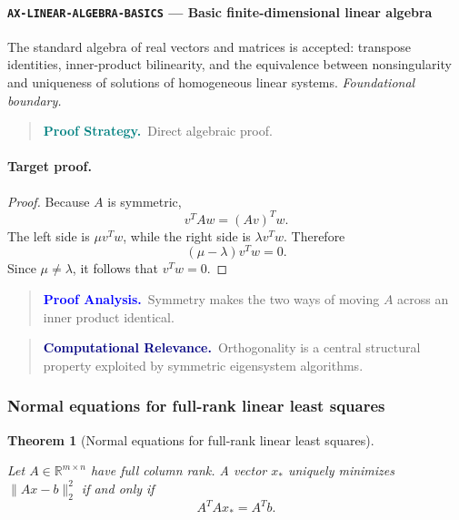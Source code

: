 \documentclass[10pt]{article}
\newcommand{\pidraw}[1]{\begingroup\urlstyle{tt}\nolinkurl{#1}\endgroup}
\newtheorem{theorem}{Theorem}[section]
\theoremstyle{definition}
\theoremstyle{remark}
\newenvironment{proofstrategy}
{\begin{quote}\small\noindent\textbf{\textcolor{teal}{Proof Strategy.}}\ }
{\end{quote}}
\newenvironment{proofanalysis}
{\begin{quote}\small\noindent\textbf{\textcolor{blue}{Proof Analysis.}}\ }
{\end{quote}}
\newenvironment{computationalrelevance}
{\begin{quote}\small\noindent\textbf{\textcolor{navy}{Computational Relevance.}}\ }
{\end{quote}}
\begin{document}
\paragraph{\pidraw{AX-LINEAR-ALGEBRA-BASICS} --- Basic finite-dimensional linear algebra}
The standard algebra of real vectors and matrices is accepted: transpose identities, inner-product bilinearity, and the equivalence between nonsingularity and uniqueness of solutions of homogeneous linear systems.
\textit{Foundational boundary.}

\begin{proofstrategy}Direct algebraic proof.\end{proofstrategy}

\paragraph{Target proof.}

\begin{proof}

Because $A$ is symmetric,
\[
v^TAw=(A v)^Tw.
\]
The left side is $\mu v^Tw$, while the right side is
$\lambda v^Tw$. Therefore
\[
(\mu-\lambda)v^Tw=0.
\]
Since $\mu\ne\lambda$, it follows that $v^Tw=0$.

\end{proof}

\begin{proofanalysis}Symmetry makes the two ways of moving $A$ across an inner product identical.\end{proofanalysis}

\begin{computationalrelevance}Orthogonality is a central structural property exploited by symmetric eigensystem algorithms.\end{computationalrelevance}

\subsubsection{Normal equations for full-rank linear least squares}

\begin{theorem}[Normal equations for full-rank linear least squares]\label{prf:THM-LEAST-SQUARES-NORMAL}

Let $A\in\mathbb{R}^{m\times n}$ have full column rank. A vector $x_*$ uniquely minimizes
$\|Ax-b\|_2^2$ if and only if
\[
A^TAx_*=A^Tb.
\]

\end{theorem}
\end{document}

